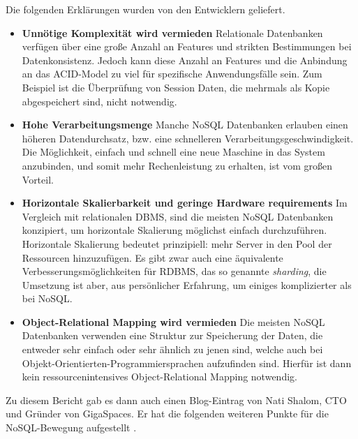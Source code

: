 Die folgenden Erklärungen wurden von den Entwicklern geliefert.
\begin{itemize}
	\item \textbf{Unnötige Komplexität wird vermieden}\newline
	 Relationale Datenbanken verfügen über eine große Anzahl an Features und strikten Bestimmungen bei Datenkonsistenz. Jedoch kann diese Anzahl an Features und die Anbindung an das ACID-Model zu viel für spezifische Anwendungsfälle sein. Zum Beispiel ist die Überprüfung von Session Daten, die mehrmals als Kopie abgespeichert sind, nicht notwendig.

	\item \textbf{Hohe Verarbeitungsmenge}\newline
	 Manche NoSQL Datenbanken erlauben einen höheren Datendurchsatz, bzw. eine schnelleren Verarbeitungsgeschwindigkeit. Die Möglichkeit, einfach und schnell eine neue Maschine in das System anzubinden, und somit mehr Rechenleistung zu erhalten, ist vom großen Vorteil.

	\item \textbf{Horizontale Skalierbarkeit und geringe Hardware requirements}\newline
	 Im Vergleich mit relationalen DBMS, sind die meisten NoSQL Datenbanken konzipiert, um horizontale Skalierung möglichst einfach durchzuführen. Horizontale Skalierung bedeutet prinzipiell: mehr Server in den Pool der Ressourcen hinzuzufügen. Es gibt zwar auch eine äquivalente Verbesserungsmöglichkeiten für RDBMS, das so genannte \textit{sharding}, die Umsetzung ist aber, aus persönlicher Erfahrung, um einiges komplizierter als bei NoSQL.

	\item \textbf{Object-Relational Mapping wird vermieden}\newline
	 Die meisten NoSQL Datenbanken verwenden eine Struktur zur Speicherung der Daten, die entweder sehr einfach oder sehr ähnlich zu jenen sind, welche auch bei Objekt-Orientierten-Programmiersprachen aufzufinden sind. Hierfür ist dann kein ressourcenintensives Object-Relational Mapping notwendig.
\end{itemize}

Zu diesem Bericht gab es dann auch einen Blog-Eintrag von Nati Shalom, CTO und Gründer von GigaSpaces. Er hat die folgenden weiteren Punkte für die NoSQL-Bewegung aufgestellt \cite{MELD.CH2-noSQL.natiShalomlol}.

